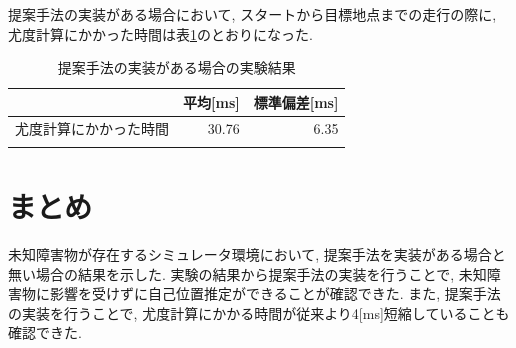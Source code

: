 提案手法の実装がある場合において, スタートから目標地点までの走行の際に, 
尤度計算にかかった時間は表\ref{tabule:likelihood_calc_time_sim_imp}のとおりになった. 

\begin{table}[ht]
  \begin{center}
    \caption{提案手法の実装がある場合の実験結果}
    \label{tabule:likelihood_calc_time_sim_imp}
    \begin{tabular}{l|r|r} 
      \thline
      & 平均[ms] &  標準偏差[ms] \\
      \hline
      尤度計算にかかった時間 & 30.76 & 6.35 \\
      \thline
    \end{tabular}
  \end{center}
\end{table}

\section{まとめ}
未知障害物が存在するシミュレータ環境において, 提案手法を実装がある場合と無い場合の結果を示した. 
実験の結果から提案手法の実装を行うことで, 未知障害物に影響を受けずに自己位置推定ができることが確認できた. 
また, 提案手法の実装を行うことで, 尤度計算にかかる時間が従来より4[ms]短縮していることも確認できた. 